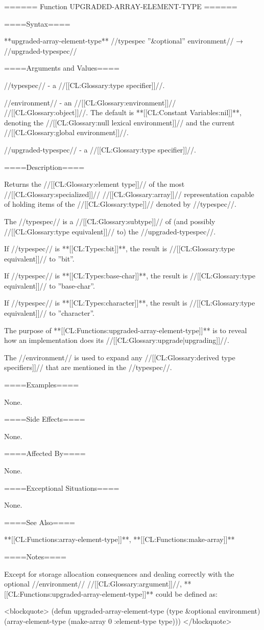 ====== Function UPGRADED-ARRAY-ELEMENT-TYPE ======

====Syntax====

**upgraded-array-element-type** //typespec ''&optional'' environment// → //upgraded-typespec//

====Arguments and Values====

//typespec// - a //[[CL:Glossary:type specifier]]//.

//environment// - an //[[CL:Glossary:environment]]// //[[CL:Glossary:object]]//. The default is **[[CL:Constant Variables:nil]]**, denoting the //[[CL:Glossary:null lexical environment]]// and the current //[[CL:Glossary:global environment]]//.

//upgraded-typespec// - a //[[CL:Glossary:type specifier]]//.

====Description====

Returns the //[[CL:Glossary:element type]]// of the most //[[CL:Glossary:specialized]]// //[[CL:Glossary:array]]// representation capable of holding items of the //[[CL:Glossary:type]]// denoted by //typespec//.

The //typespec// is a //[[CL:Glossary:subtype]]// of (and possibly //[[CL:Glossary:type equivalent]]// to) the //upgraded-typespec//.

If //typespec// is **[[CL:Types:bit]]**, the result is //[[CL:Glossary:type equivalent]]// to ''bit''.

If //typespec// is **[[CL:Types:base-char]]**, the result is //[[CL:Glossary:type equivalent]]// to ''base-char''.

If //typespec// is **[[CL:Types:character]]**, the result is //[[CL:Glossary:type equivalent]]// to ''character''.

The purpose of **[[CL:Functions:upgraded-array-element-type]]** is to reveal how an implementation does its //[[CL:Glossary:upgrade|upgrading]]//.

The //environment// is used to expand any //[[CL:Glossary:derived type specifiers]]// that are mentioned in the //typespec//.

====Examples====

None.

====Side Effects====

None.

====Affected By====

None.

====Exceptional Situations====

None.

====See Also====

**[[CL:Functions:array-element-type]]**, **[[CL:Functions:make-array]]**

====Notes====

Except for storage allocation consequences and dealing correctly with the optional //environment// //[[CL:Glossary:argument]]//, **[[CL:Functions:upgraded-array-element-type]]** could be defined as:

<blockquote> (defun upgraded-array-element-type (type &optional environment) (array-element-type (make-array 0 :element-type type))) </blockquote>


  
